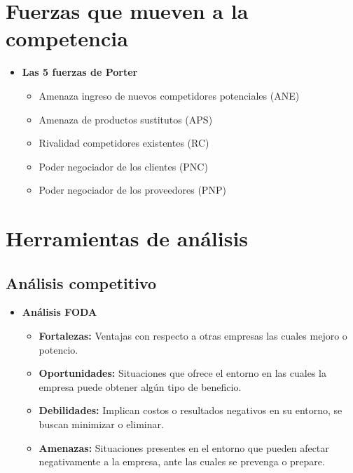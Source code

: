 \documentclass{templateNote}
\begin{document}
\section{Fuerzas que mueven a la competencia}
\begin{itemize}
    \item \textbf{Las 5 fuerzas de Porter}
    \begin{itemize}
        \item Amenaza ingreso de nuevos competidores potenciales (ANE)
        \item Amenaza de productos sustitutos (APS)
        \item Rivalidad competidores existentes (RC)
        \item Poder negociador de los clientes (PNC)
        \item Poder negociador de los proveedores (PNP)
    \end{itemize}
\end{itemize}

\section{Herramientas de análisis}
\subsection{Análisis competitivo}
    \begin{itemize}
        \item \textbf{Análisis FODA}
        \begin{itemize}
            \item \textbf{Fortalezas:} Ventajas con respecto a otras empresas las cuales mejoro o potencio.
            \item \textbf{Oportunidades:} Situaciones que ofrece el entorno en las cuales la empresa puede obtener algún tipo de beneficio.
            \item \textbf{Debilidades:} Implican costos o resultados negativos en su entorno, se buscan minimizar o eliminar.
            \item \textbf{Amenazas:} Situaciones presentes en el entorno que pueden afectar negativamente a la empresa, ante las cuales se prevenga o prepare.
        \end{itemize}
    \end{itemize}
\end{document}
